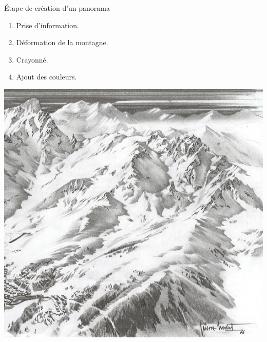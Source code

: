 \documentclass{beamer}
\begin{document}
\begin{frame}[noframenumbering]{Étape de création d'un panorama}
\begin{enumerate}
\item Prise d'information.
\item Déformation de la montagne.
\item Crayonné. 
\item Ajout des couleurs. 
\end{enumerate}

\begin{center}
    \begin{minipage}[c]{0.45\linewidth}
    \begin{center}
    	\includegraphics[width=1.0\linewidth]{Images/crayonn_.png}
    \end{center}
    \end{minipage}
    \hspace{0.2cm}
    \begin{minipage}[c]{0.45\linewidth}
    \begin{center}

\end{center}
\end{minipage}
\end{center}
\end{frame}
\end{document}
